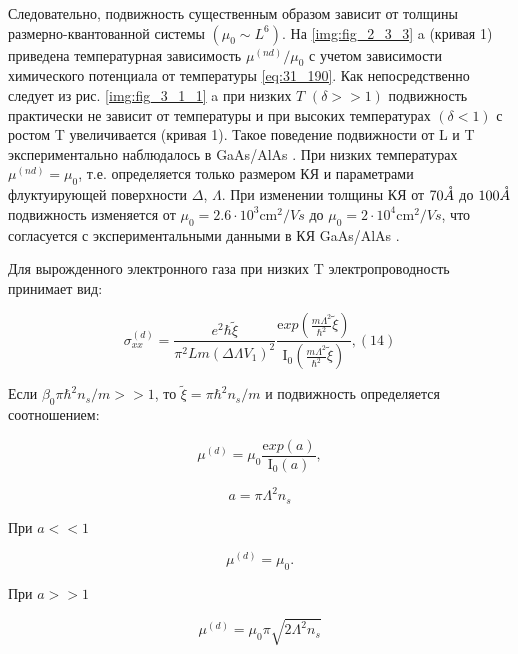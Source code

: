Следовательно, подвижность существенным образом зависит от толщины размерно-квантованной системы $(\mu _{0} \sim L^{6} )$. На \ref{img:fig_2_3_3} a (кривая 1) приведена температурная зависимость $\mu ^{(nd)} /\mu _{0} $ с учетом зависимости химического потенциала от температуры \eqref{eq:31_190}. Как непосредственно следует из рис. \ref{img:fig_3_1_1} a при низких $T$ $(\delta >>1)$ подвижность практически не зависит от температуры и при высоких температурах $(\delta <1)$ с ростом T увеличивается (кривая 1). Такое поведение подвижности от L и T экспериментально наблюдалось в GaAs/AlAs \cite{Sakaki1987}. При низких температурах $\mu ^{(nd)} =\mu _{0} $, т.е. определяется только размером КЯ и параметрами флуктуирующей поверхности $\Delta $, $\Lambda $. При изменении толщины КЯ от $70 \AA$ до $100 \AA$ подвижность изменяется от $\mu _{0} =2.6\cdot 10^{3} \text{cm}^{2} /{Vs}$ до $\mu _{0} =2\cdot 10^{4} \text{cm}^{2} /{Vs}$, что согласуется с экспериментальными данными в КЯ GaAs/AlAs \cite{Sakaki1987}.

Для вырожденного электронного газа при низких T электропроводность принимает вид:

\begin{equation} \label{eq:31_210}
\sigma _{xx}^{(d)} =\frac{e^{2} \hbar \tilde{\xi }}{\pi ^{2} Lm\left(\Delta \Lambda V_{1} \right)^{2} } \frac{{\mathrm exp}\left(\frac{m\Lambda ^{2} }{\hbar ^{2} } \tilde{\xi }\right)}{{\mathrm I}_{{\mathrm 0}} \left(\frac{m\Lambda ^{2} }{\hbar ^{2} } \tilde{\xi }\right)} ,    (14)
\end{equation}


Если $\beta _{0} \pi \hbar ^{2} n_{s} /m>>1$, то $\tilde{\xi }=\pi \hbar ^{2} n_{s} /m$ и подвижность определяется соотношением:

\begin{equation} \label{eq:31_220}
\mu ^{(d)} =\mu _{0} \frac{{\mathrm exp}\left(a\right)}{{\mathrm I}_{{\mathrm 0}} \left(a\right)},
\end{equation}

\[
a=\pi \Lambda ^{2} n_{s}
\]

При $a<<1$ 

\begin{equation} \label{eq:31_230}     
\mu ^{(d)} =\mu _{0}.
\end{equation}

При $a>>1$

\begin{equation} \label{eq:31_240}  
\mu ^{(d)} =\mu _{0} \pi \sqrt{2\Lambda ^{2} n_{s} }
\end{equation}

